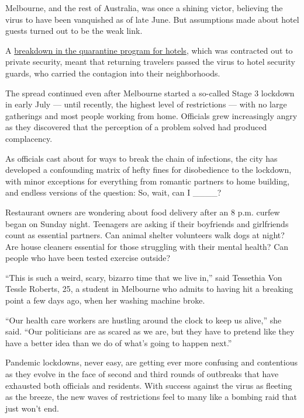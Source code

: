 Melbourne, and the rest of Australia, was once a shining victor,
believing the virus to have been vanquished as of late June. But
assumptions made about hotel guests turned out to be the weak link.

A
\href{https://www.theage.com.au/national/victoria/how-hotel-quarantine-let-covid-19-out-of-the-bag-in-victoria-20200703-p558og.html}{breakdown
in the quarantine program for hotels}, which was contracted out to
private security, meant that returning travelers passed the virus to
hotel security guards, who carried the contagion into their
neighborhoods.

The spread continued even after Melbourne started a so-called Stage 3
lockdown in early July --- until recently, the highest level of
restrictions --- with no large gatherings and most people working from
home. Officials grew increasingly angry as they discovered that the
perception of a problem solved had produced complacency.

As officials cast about for ways to break the chain of infections, the
city has developed a confounding matrix of hefty fines for disobedience
to the lockdown, with minor exceptions for everything from romantic
partners to home building, and endless versions of the question: So,
wait, can I \_\_\_\_?

Restaurant owners are wondering about food delivery after an 8 p.m.
curfew began on Sunday night. Teenagers are asking if their boyfriends
and girlfriends count as essential partners. Can animal shelter
volunteers walk dogs at night? Are house cleaners essential for those
struggling with their mental health? Can people who have been tested
exercise outside?

``This is such a weird, scary, bizarro time that we live in,'' said
Tessethia Von Tessle Roberts, 25, a student in Melbourne who admits to
having hit a breaking point a few days ago, when her washing machine
broke.

``Our health care workers are hustling around the clock to keep us
alive,'' she said. ``Our politicians are as scared as we are, but they
have to pretend like they have a better idea than we do of what's going
to happen next.''

Pandemic lockdowns, never easy, are getting ever more confusing and
contentious as they evolve in the face of second and third rounds of
outbreaks that have exhausted both officials and residents. With success
against the virus as fleeting as the breeze, the new waves of
restrictions feel to many like a bombing raid that just won't end.


